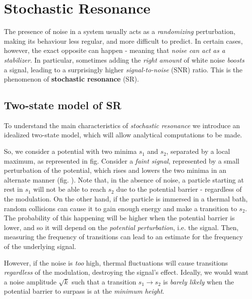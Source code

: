 \documentclass[../template.tex]{subfiles}
\begin{document}
\chapter{Stochastic Resonance}
The presence of noise in a system usually acts as a \textit{randomizing} perturbation, making its behaviour less regular, and more difficult to predict. In certain cases, however, the exact opposite can happen - meaning that \textit{noise can act as a stabilizer}. In particular, sometimes adding the \textit{right amount} of white noise \textit{boosts} a signal, leading  to a surprisingly higher \textit{signal-to-noise} (SNR) ratio. This is the phenomenon of \textbf{stochastic resonance} (SR).   

\section{Two-state model of SR}
To understand the main characteristics of \textit{stochastic resonance} we introduce an idealized two-state model, which will allow analytical  computations to be made. 

\medskip

So, we consider a potential with two minima $s_1$ and $s_2$, separated by a local maximum, as represented in fig. %
Consider a \textit{faint signal}, represented by a small perturbation of the potential, which rises and lowers the two minima in an alternate manner (fig. ). %
Note that, in the absence of noise, a particle starting at rest in $s_1$ will not be able to reach $s_2$ due to the potential barrier - regardless of the modulation. On the other hand, if the particle is immersed in a thermal bath, random collisions can cause it to gain enough energy and make a transition to $s_2$. The probability of this happening will be higher when the potential barrier is lower, and so it will depend on the \textit{potential perturbation}, i.e. the signal. Then, measuring the frequency of transitions can lead to an estimate for the frequency of the underlying signal. 

However, if the noise is \textit{too} high, thermal fluctuations will cause transitions \textit{regardless} of the modulation, destroying the signal's effect. Ideally, we would want a noise amplitude $\sqrt{k}$ such that a transition $s_1 \to s_2$ is \textit{barely likely} when the potential barrier to surpass is at the \textit{minimum height}. 

\medskip
\end{document}
